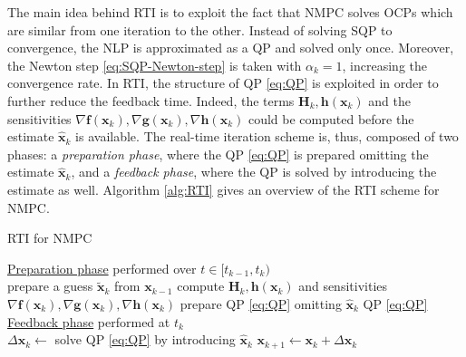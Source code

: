 The main idea behind RTI is to exploit the fact that NMPC solves OCPs which 
are similar from one iteration to the other. Instead of solving SQP to convergence,
the NLP is approximated as a QP and solved only once. Moreover, the Newton step
\eqref{eq:SQP-Newton-step} is taken with $\alpha_k=1$, increasing the convergence
rate. In RTI, the structure of QP \eqref{eq:QP} is exploited in order to further
reduce the feedback time. Indeed, the terms $\bm{H}_k, \bm{h}(\bm{x}_k)$
and the sensitivities $\nabla \bm{f}(\bm{x}_k), \nabla \bm{g}({\bm{x}_k}), \nabla \bm{h}({\bm{x}_k})$
could be computed before the estimate $\hat{\bm{x}}_k$ is available. The real-time
iteration scheme is, thus, composed of two phases: a \textit{preparation phase},
where the QP \eqref{eq:QP} is prepared omitting the estimate $\hat{\bm{x}}_k$, and a 
\textit{feedback phase}, where the QP is solved by introducing the estimate as well.
Algorithm \ref{alg:RTI} gives an overview of the RTI scheme for NMPC.

\begin{algorithm}
	\small
	\caption{RTI for NMPC}
	\label{alg:RTI}
    \nonl \underline{Preparation phase} performed over $t \in [t_{k-1}, t_k)$\\
    prepare a guess $\tilde{\bm{x}}_k$ from $\bm{x}_{k-1}$ \;
    compute $\bm{H}_k, \bm{h}(\bm{x}_k)$ and sensitivities $\nabla \bm{f}(\bm{x}_k), \nabla \bm{g}({\bm{x}_k}), \nabla \bm{h}({\bm{x}_k})$\;
    prepare QP \eqref{eq:QP} omitting $\hat{\bm{x}}_k$\;
    \Return{} QP \eqref{eq:QP}\;
    \BlankLine
    \nonl \underline{Feedback phase} performed at $t_k$\\
    $\Delta \bm{x}_{k} \leftarrow$ solve QP \eqref{eq:QP} by introducing $\hat{\bm{x}}_k$\;
    $\bm{x}_{k+1} \leftarrow \bm{x}_k + \Delta \bm{x}_k$\;
    \;
\end{algorithm}
